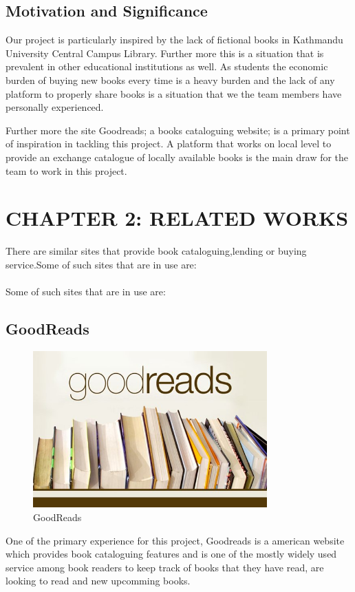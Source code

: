 \documentclass[12pt]{article}
\begin{document}
\subsection{Motivation and Significance}
Our project is particularly inspired by the lack of fictional books in Kathmandu University Central
Campus Library. Further more this is a situation that is prevalent in other educational institutions
as well. As students the economic burden of buying new books every time is a heavy burden and the
lack of any platform to properly share books is a situation that we the team members have personally
experienced.

Further more the site Goodreads; a books cataloguing website; is a primary point of inspiration in
tackling this project. A platform that works on local level to provide an exchange catalogue of locally
available books is the main draw for the team to work in this project.

\clearpage

\section{CHAPTER 2: RELATED WORKS}
There are similar sites that provide book cataloguing,lending or buying service.Some of such sites that
are in use are:
\\\\
Some of such sites that are in use are:

\subsection{GoodReads}
\begin{figure}[h]
    \centerline{\includegraphics[width = 90mm]{goodreads.jpg}}
    \caption{GoodReads}
    \label{fig}
\end{figure}
One of the primary experience for this project, Goodreads is a american website which provides book
cataloguing features and is one of the mostly widely used service among book readers to keep track of
books that they have read, are looking to read and new upcomming books.
\vspace{10mm}
\clearpage
\end{document}

